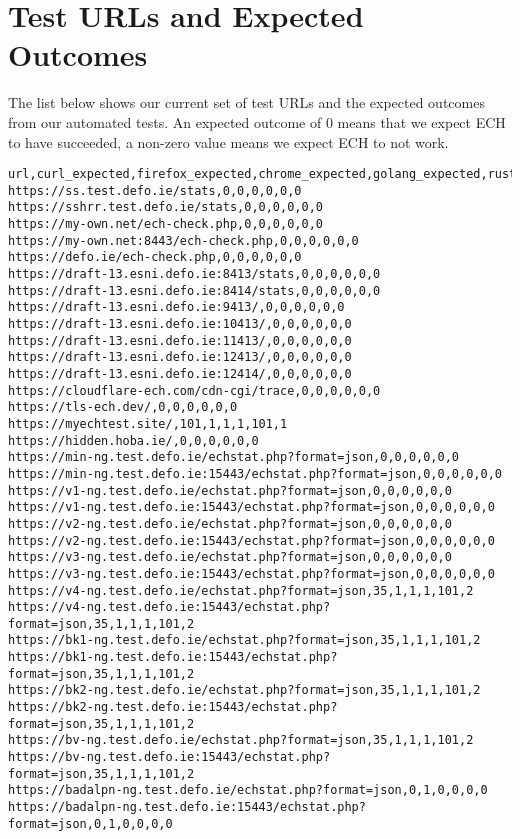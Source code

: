 
\section{Test URLs and Expected Outcomes}
\label{app:urls}

The list below shows our current set of test URLs
and the expected outcomes from our automated tests.
An expected outcome of 0 means that we expect ECH
to have succeeded, a non-zero value means we expect
ECH to not work.

\tiny
\begin{verbatim}
url,curl_expected,firefox_expected,chrome_expected,golang_expected,rust_expected,py_expected
https://ss.test.defo.ie/stats,0,0,0,0,0,0
https://sshrr.test.defo.ie/stats,0,0,0,0,0,0
https://my-own.net/ech-check.php,0,0,0,0,0,0
https://my-own.net:8443/ech-check.php,0,0,0,0,0,0
https://defo.ie/ech-check.php,0,0,0,0,0,0
https://draft-13.esni.defo.ie:8413/stats,0,0,0,0,0,0
https://draft-13.esni.defo.ie:8414/stats,0,0,0,0,0,0
https://draft-13.esni.defo.ie:9413/,0,0,0,0,0,0
https://draft-13.esni.defo.ie:10413/,0,0,0,0,0,0
https://draft-13.esni.defo.ie:11413/,0,0,0,0,0,0
https://draft-13.esni.defo.ie:12413/,0,0,0,0,0,0
https://draft-13.esni.defo.ie:12414/,0,0,0,0,0,0
https://cloudflare-ech.com/cdn-cgi/trace,0,0,0,0,0,0
https://tls-ech.dev/,0,0,0,0,0,0
https://myechtest.site/,101,1,1,1,101,1
https://hidden.hoba.ie/,0,0,0,0,0,0
https://min-ng.test.defo.ie/echstat.php?format=json,0,0,0,0,0,0
https://min-ng.test.defo.ie:15443/echstat.php?format=json,0,0,0,0,0,0
https://v1-ng.test.defo.ie/echstat.php?format=json,0,0,0,0,0,0
https://v1-ng.test.defo.ie:15443/echstat.php?format=json,0,0,0,0,0,0
https://v2-ng.test.defo.ie/echstat.php?format=json,0,0,0,0,0,0
https://v2-ng.test.defo.ie:15443/echstat.php?format=json,0,0,0,0,0,0
https://v3-ng.test.defo.ie/echstat.php?format=json,0,0,0,0,0,0
https://v3-ng.test.defo.ie:15443/echstat.php?format=json,0,0,0,0,0,0
https://v4-ng.test.defo.ie/echstat.php?format=json,35,1,1,1,101,2
https://v4-ng.test.defo.ie:15443/echstat.php?format=json,35,1,1,1,101,2
https://bk1-ng.test.defo.ie/echstat.php?format=json,35,1,1,1,101,2
https://bk1-ng.test.defo.ie:15443/echstat.php?format=json,35,1,1,1,101,2
https://bk2-ng.test.defo.ie/echstat.php?format=json,35,1,1,1,101,2
https://bk2-ng.test.defo.ie:15443/echstat.php?format=json,35,1,1,1,101,2
https://bv-ng.test.defo.ie/echstat.php?format=json,35,1,1,1,101,2
https://bv-ng.test.defo.ie:15443/echstat.php?format=json,35,1,1,1,101,2
https://badalpn-ng.test.defo.ie/echstat.php?format=json,0,1,0,0,0,0
https://badalpn-ng.test.defo.ie:15443/echstat.php?format=json,0,1,0,0,0,0

\end{verbatim}
